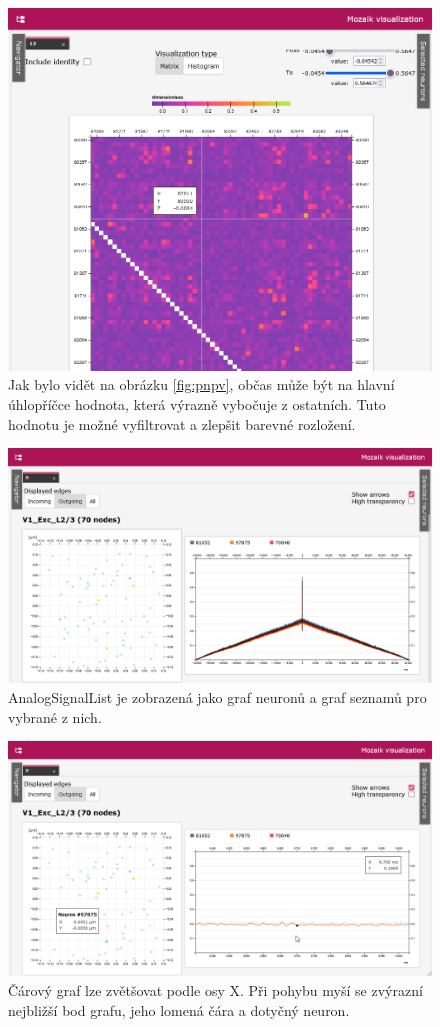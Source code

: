 \begin{figure}
	\centering
	\includegraphics[width=1\linewidth]{img/screenshot_pnpv_noident.png}
	\caption{Jak bylo vidět na obrázku \ref{fig:pnpv}, občas může být na hlavní úhlopříčce hodnota, která výrazně vybočuje z ostatních. Tuto hodnotu je možné vyfiltrovat a zlepšit barevné rozložení.}
	\label{fig:pnpv_noident}
\end{figure}

\begin{figure}
	\centering
	\includegraphics[width=1\linewidth]{img/screenshot_asl.png}
	\caption{AnalogSignalList je zobrazená jako graf neuronů a graf seznamů pro vybrané z nich.}
	\label{fig:asl}
\end{figure}

\begin{figure}
	\centering
	\includegraphics[width=1\linewidth]{img/screenshot_asl_zoom.png}
	\caption{Čárový graf lze zvětšovat podle osy X. Při pohybu myší se zvýrazní nejbližší bod grafu, jeho lomená čára a dotyčný neuron.}
	\label{fig:asl_zoom}
\end{figure}